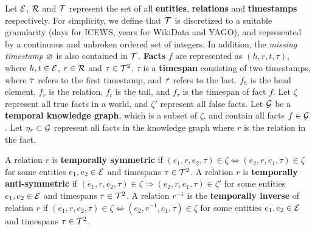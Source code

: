 

Let $\mathcal{E}$, $\mathcal{R}$ and $\mathcal{T}$ represent the set of all \textbf{entities}, \textbf{relations} and \textbf{timestamps} respectively. For simplicity, we define that $\mathcal{T}$ is discretized to a suitable granularity (days for \mbox{ICEWS}, years for WikiData and YAGO), and represented by a continuous and unbroken ordered set of integers. In addition, the \textit{missing timestamp} $\varnothing$ is also contained in $\mathcal{T}$. \textbf{Facts} $f$ are represented as $(h, r, t, \tau)$, where $h, t \in \mathcal{E}$, $r \in \mathcal{R}$ and $\tau \in \mathcal{T}^2$. $\tau$ is a \textbf{timespan} consisting of two timestamps, where $\timebegin{\tau}$ refers to the first timestamp, and $\timeend{\tau}$ refers to the last. $f_h$ is the head element, $f_r$ is the relation, $f_t$ is the tail, and $f_\tau$ is the timespan of fact $f$. 
Let $\zeta$ represent all true facts in a world, and $\zeta'$ represent all false facts. Let $\mathcal{G}$ be a \textbf{temporal knowledge graph}, which is a subset of $\zeta$, and contain all facts $f \in \mathcal{G}$. Let $\eta_r \subset \mathcal{G}$ represent all facts in the knowledge graph where $r$ is the relation in the fact.



A relation $r$ is \textbf{temporally symmetric} if $(e_1, r, e_2, \tau) \in \zeta \Leftrightarrow (e_2, r, e_1, \tau) \in \zeta$ for some entities $e_1, e_2 \in \mathcal{E}$ and timespans $\tau \in \mathcal{T}^2$.
A relation $r$ is \textbf{temporally anti-symmetric} if $(e_1, r, e_2, \tau) \in \zeta \Rightarrow (e_2, r, e_1, \tau) \in \zeta'$ for some entities $e_1, e_2 \in \mathcal{E}$ and timespans $\tau \in \mathcal{T}^2$.
A relation $r^{-1}$ is the \textbf{temporally inverse} of relation $r$ if $(e_1, r, e_2, \tau) \in \zeta \Leftrightarrow (e_2, r^{-1}, e_1, \tau) \in \zeta$ for some entities $e_1, e_2 \in \mathcal{E}$ and timespans $\tau \in \mathcal{T}^2$.

